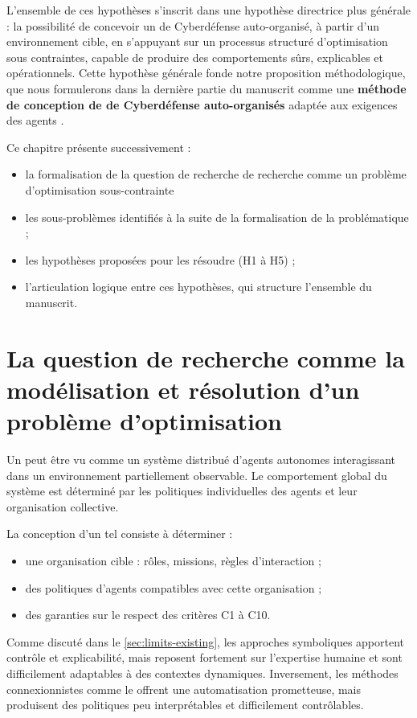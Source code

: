 L'ensemble de ces hypothèses s'inscrit dans une hypothèse directrice plus générale : la possibilité de concevoir un  de Cyberdéfense auto-organisé, à partir d'un environnement cible, en s'appuyant sur un processus structuré d'optimisation sous contraintes, capable de produire des comportements sûrs, explicables et opérationnels. Cette hypothèse générale fonde notre proposition méthodologique, que nous formulerons dans la dernière partie du manuscrit comme une \textbf{méthode de conception de  de Cyberdéfense auto-organisés} adaptée aux exigences des agents .

Ce chapitre présente successivement :
\begin{itemize}
    \item la formalisation de la question de recherche de recherche comme un problème d'optimisation sous-contrainte
    \item les sous-problèmes identifiés à la suite de la formalisation de la problématique ;
    \item les hypothèses proposées pour les résoudre (H1 à H5) ;
    \item l'articulation logique entre ces hypothèses, qui structure l'ensemble du manuscrit.
\end{itemize}

\section{La question de recherche comme la modélisation et résolution d'un problème d'optimisation}

Un  peut être vu comme un système distribué d'agents autonomes interagissant dans un environnement partiellement observable. Le comportement global du système est déterminé par les politiques individuelles des agents et leur organisation collective.

La conception d'un tel  consiste à déterminer :
\begin{itemize}
    \item une organisation cible : rôles, missions, règles d'interaction ;
    \item des politiques d'agents compatibles avec cette organisation ;
    \item des garanties sur le respect des critères C1 à C10.
\end{itemize}

Comme discuté dans le \autoref{sec:limits-existing}, les approches symboliques apportent contrôle et explicabilité, mais reposent fortement sur l'expertise humaine et sont difficilement adaptables à des contextes dynamiques. Inversement, les méthodes connexionnistes comme le  offrent une automatisation prometteuse, mais produisent des politiques peu interprétables et difficilement contrôlables.

